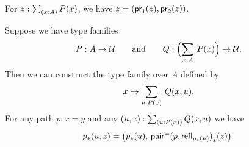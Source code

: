\documentclass[hott-all.tex]{subfiles}
\begin{document}
\begin{cor}\label{thm:eta-sigma}
  For $z:\sm{x:A} P(x)$, we have $z = (\mathsf{pr}_{1}(z),\mathsf{pr}_{2}(z))$.
\end{cor}
%
%

\begin{thm}\label{transport-Sigma}
  Suppose we have type families
  \begin{equation*}
    P:A\to\type
    \qquad\text{and}\qquad
    Q:\Parens{\sm{x:A} P(x)}\to\type.
  \end{equation*}
  Then we can construct the type family over $A$ defined by
  \begin{equation*}
    x \mapsto \sm{u:P(x)} Q(x,u).
  \end{equation*}
  For any path $p:x=y$ and any $(u,z):\sm{u:P(x)} Q(x,u)$ we have
  \begin{equation*}
    {p}_{*}\mathopen{}\left({u,z}\right)\mathclose{}=\big({p}_{*}\mathopen{}\left({u}\right)\mathclose{},\,{\mathsf{pair}^{\mathord{=}}(p,\mathsf{refl}_{{p}_{*}\mathopen{}\left({u}\right)\mathclose{}})}_{*}\mathopen{}\left({z}\right)\mathclose{}\big).
  \end{equation*}
\end{thm}
%
%
%
\end{document}
